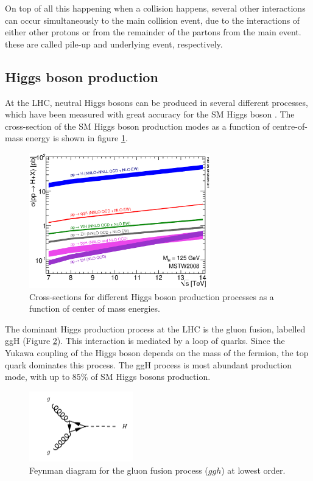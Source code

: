 On top of all this happening when a collision happens, several other interactions can occur simultaneously to the main collision event, due to the interactions of either other protons or from the remainder of the partons from the main event. these are called pile-up and underlying event, respectively.

\subsection{Higgs boson production}

At the LHC, neutral Higgs bosons can be produced in several different processes, which have been measured with great accuracy for the SM Higgs boson \cite{Dittmaier:1318996}. The cross-section of the SM Higgs boson production modes as a function of centre-of-mass energy is shown in figure \ref{fig:higgscrosssec}.

\begin{figure}
    \centering
    \includegraphics[width=0.7\textwidth]{Images/xsec.eps}
    \caption{Cross-sections for different Higgs boson production processes as a function of center of mass energies.}
    \label{fig:higgscrosssec}
\end{figure}

The dominant Higgs production process at the LHC is the gluon fusion, labelled ggH (Figure \ref{fig:ggh}). This interaction is mediated by a loop of quarks. Since the Yukawa coupling of the Higgs boson depends on the mass of the fermion, the top quark dominates this process. The ggH process is most abundant production mode, with up to $85\%$ of SM Higgs bosons production.


\begin{figure}
    \centering
    \includegraphics[width=0.4\textwidth]{Images/ggh.pdf}
    \caption{Feynman diagram for the gluon fusion process ($ggh$) at lowest order.}
    \label{fig:ggh}
\end{figure}



